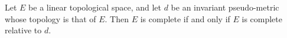 Let $E$ be a linear topological space, and let $d$ be an invariant pseudo-metric whose topology is that of $E$. Then $E$ is complete if and only if $E$ is complete relative to $d$.
